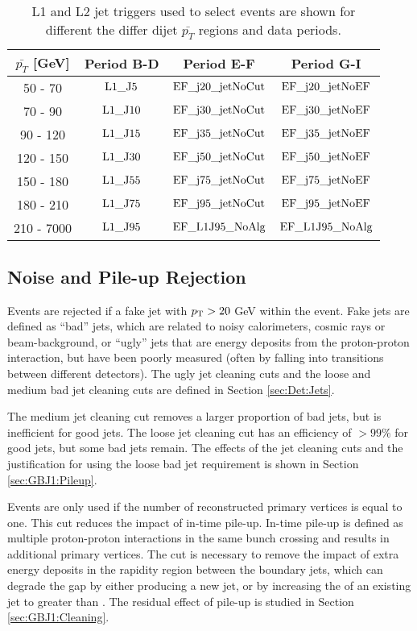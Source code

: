 \begin{table}[htdp]
\centering
\begin{tabular}{ | c | c | c | c | }
  \hline                       
 $\bar{p_T}$ [GeV] & Period B-D & Period E-F & Period G-I \\
  \hline                       
50 - 70   & $\rm L1\_J5$  & $\rm EF\_j20\_jetNoCut$ & $\rm EF\_j20\_jetNoEF$ \\
70 - 90   & $\rm L1\_J10$ & $\rm EF\_j30\_jetNoCut$ & $\rm EF\_j30\_jetNoEF$ \\
90 - 120  & $\rm L1\_J15$ & $\rm EF\_j35\_jetNoCut$ & $\rm EF\_j35\_jetNoEF$ \\
120 - 150  & $\rm L1\_J30$ & $\rm EF\_j50\_jetNoCut$ & $\rm EF\_j50\_jetNoEF$ \\
150 - 180  & $\rm L1\_J55$ & $\rm EF\_j75\_jetNoCut$ & $\rm EF\_j75\_jetNoEF$ \\
180 - 210  & $\rm L1\_J75$ & $\rm EF\_j95\_jetNoCut$ & $\rm EF\_j95\_jetNoEF$ \\ 
210 - 7000  & $\rm L1\_J95$ & $\rm EF\_L1J95\_NoAlg$  & $\rm EF\_L1J95\_NoAlg$ \\
  \hline                       
\end{tabular}
\caption[Trigger strategy using jet triggers]{
L1 and L2 jet triggers used to select events are shown for different the differ dijet $\bar{p_T}$ regions and data periods. 
\label{tab:trig_strat}}
\end{table}%

\subsection{Noise and Pile-up Rejection}

Events are rejected if a fake jet with $\mbox{$p_{\rm T}$}{}>20$ GeV within the event.
Fake jets are defined as ``bad'' jets, which are related to noisy calorimeters, cosmic rays or beam-background, or ``ugly'' jets that are energy deposits from the proton-proton interaction, but have been poorly measured (often by falling into transitions between different detectors). 
The ugly jet cleaning cuts and the loose and medium bad jet cleaning cuts are defined in Section \ref{sec:Det:Jets}.

The medium jet cleaning cut removes a larger proportion of bad jets, but is inefficient for good jets.
The loose jet cleaning cut has an efficiency of $>99\%$ for good jets, but some bad jets remain.
The effects of the jet cleaning cuts and the justification for using the loose bad jet requirement is shown in Section \ref{sec:GBJ1:Pileup}.


Events are only used if the number of reconstructed primary vertices is equal to one.
This cut reduces the impact of in-time pile-up. 
In-time pile-up is defined as multiple proton-proton interactions in the same bunch crossing and results in additional primary vertices.
The cut is necessary to remove the impact of extra energy deposits in the rapidity region between the boundary jets, which can degrade the gap by either producing a new jet, or by increasing the \pt{} of an existing jet to greater than \qz{}.
The residual effect of pile-up is studied in Section \ref{sec:GBJ1:Cleaning}. 

